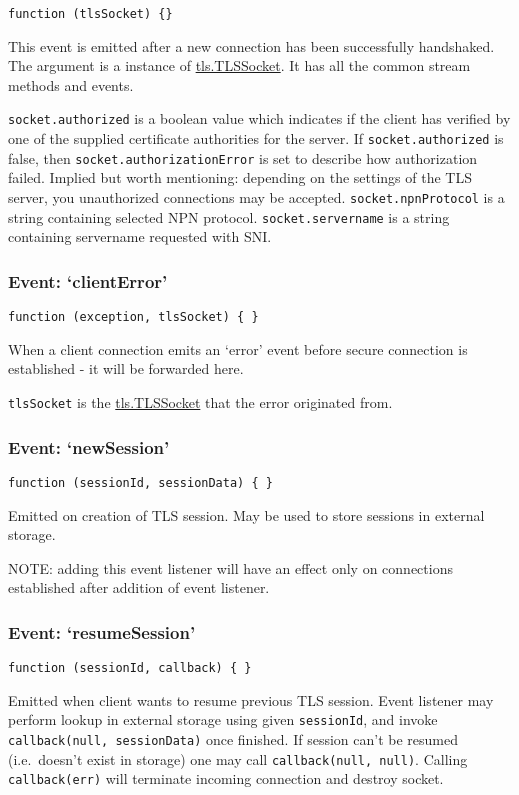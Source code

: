 \texttt{function (tlsSocket) \{\}}

This event is emitted after a new connection has been successfully
handshaked. The argument is a instance of
\hyperref[tls\_class\_tls\_tlssocket]{tls.TLSSocket}. It has all the
common stream methods and events.

\texttt{socket.authorized} is a boolean value which indicates if the
client has verified by one of the supplied certificate authorities for
the server. If \texttt{socket.authorized} is false, then
\texttt{socket.authorizationError} is set to describe how authorization
failed. Implied but worth mentioning: depending on the settings of the
TLS server, you unauthorized connections may be accepted.
\texttt{socket.npnProtocol} is a string containing selected NPN
protocol. \texttt{socket.servername} is a string containing servername
requested with SNI.

\subsubsection{Event: `clientError'}

\texttt{function (exception, tlsSocket) \{ \}}

When a client connection emits an `error' event before secure connection
is established - it will be forwarded here.

\texttt{tlsSocket} is the
\hyperref[tls\_class\_tls\_tlssocket]{tls.TLSSocket} that the error
originated from.

\subsubsection{Event: `newSession'}

\texttt{function (sessionId, sessionData) \{ \}}

Emitted on creation of TLS session. May be used to store sessions in
external storage.

NOTE: adding this event listener will have an effect only on connections
established after addition of event listener.

\subsubsection{Event: `resumeSession'}

\texttt{function (sessionId, callback) \{ \}}

Emitted when client wants to resume previous TLS session. Event listener
may perform lookup in external storage using given \texttt{sessionId},
and invoke \texttt{callback(null, sessionData)} once finished. If
session can't be resumed (i.e.~doesn't exist in storage) one may call
\texttt{callback(null, null)}. Calling \texttt{callback(err)} will
terminate incoming connection and destroy socket.

